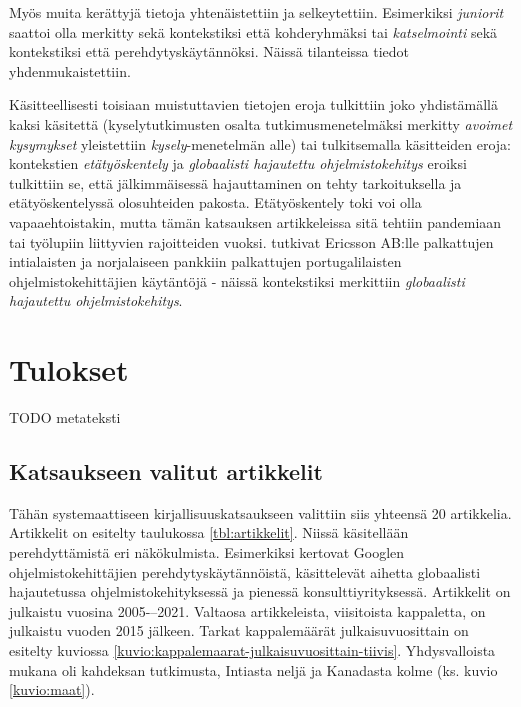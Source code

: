\documentclass[utf8]{gradu3}
\begin{document}
Myös muita kerättyjä tietoja yhtenäistettiin ja selkeytettiin. Esimerkiksi \textit{juniorit} saattoi olla merkitty sekä kontekstiksi että kohderyhmäksi tai \textit{katselmointi} sekä kontekstiksi että perehdytyskäytännöksi. Näissä tilanteissa tiedot yhdenmukaistettiin.

Käsitteellisesti toisiaan muistuttavien tietojen eroja tulkittiin joko yhdistämällä kaksi käsitettä (kyselytutkimusten osalta tutkimusmenetelmäksi merkitty \textit{avoimet kysymykset} yleistettiin \textit{kysely}-menetelmän alle) tai tulkitsemalla käsitteiden eroja: kontekstien \textit{etätyöskentely} ja \textit{globaalisti hajautettu ohjelmistokehitys} eroiksi tulkittiin se, että jälkimmäisessä hajauttaminen on tehty tarkoituksella ja etätyöskentelyssä olosuhteiden pakosta. Etätyöskentely toki voi olla vapaaehtoistakin, mutta tämän katsauksen artikkeleissa sitä tehtiin pandemiaan \parencite{rodeghero-ym-2021} tai työlupiin \parencite{hemphill-begel-2011} liittyvien rajoitteiden vuoksi. \textcite{britto-ym-2020} tutkivat Ericsson AB:lle palkattujen intialaisten ja \textcite{moe-ym-2020} norjalaiseen pankkiin palkattujen portugalilaisten ohjelmistokehittäjien käytäntöjä - näissä kontekstiksi merkittiin \textit{globaalisti hajautettu ohjelmistokehitys}.

\chapter{Tulokset}
\label{paaluku-tulokset}

TODO metateksti

\section{Katsaukseen valitut artikkelit}

Tähän systemaattiseen kirjallisuuskatsaukseen valittiin siis yhteensä 20 artikkelia. Artikkelit on esitelty taulukossa \ref{tbl:artikkelit}. Niissä käsitellään perehdyttämistä eri näkökulmista. Esimerkiksi \textcite{johnson-senges-2010} kertovat Googlen ohjelmistokehittäjien perehdytyskäytännöistä, \textcite{britto-ym-2020} käsittelevät aihetta globaalisti hajautetussa ohjelmistokehityksessä ja \textcite{bjornson-dingsøyr-2005} pienessä konsulttiyrityksessä. Artikkelit on julkaistu vuosina 2005-–2021. Valtaosa artikkeleista, viisitoista kappaletta, on julkaistu vuoden 2015 jälkeen. Tarkat kappalemäärät julkaisuvuosittain on esitelty kuviossa \ref{kuvio:kappalemaarat-julkaisuvuosittain-tiivis}. Yhdysvalloista mukana oli kahdeksan tutkimusta, Intiasta neljä ja Kanadasta kolme (ks. kuvio \ref{kuvio:maat}).
\end{document}
